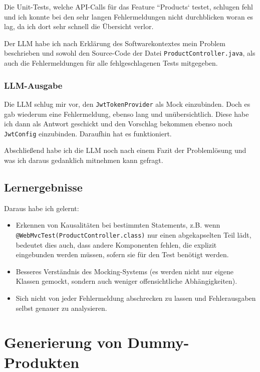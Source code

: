 \documentclass[12pt, a4paper]{scrreprt}
\begin{document}
	Die Unit-Tests, welche API-Calls für das Feature ``Products` testet, schlugen fehl und ich konnte bei den sehr langen Fehlermeldungen nicht durchblicken woran es lag, da ich dort sehr schnell die Übersicht verlor.

	Der LLM habe ich nach Erklärung des Softwarekontextes mein Problem beschrieben und sowohl den Source-Code der Datei \texttt{ProductController.java}, als auch die Fehlermeldungen für alle fehlgeschlagenen Tests mitgegeben.

	\subsubsection{LLM-Ausgabe}

	Die LLM schlug mir vor, den \texttt{JwtTokenProvider} als Mock einzubinden. Doch es gab wiederum eine Fehlermeldung, ebenso lang und unübersichtlich. Diese habe ich dann als Antwort geschickt und den Vorschlag bekommen ebenso noch \texttt{JwtConfig} einzubinden. Daraufhin hat es funktioniert.

	Abschließend habe ich die LLM noch nach einem Fazit der Problemlösung und was ich daraus gedanklich mitnehmen kann gefragt.

	\subsection{Lernergebnisse}

	Daraus habe ich gelernt:

	\begin{itemize}
		\item Erkennen von Kausalitäten bei bestimmten Statements, \linebreak z.B. wenn
		\texttt{@WebMvcTest(ProductController.}\texttt{class)} nur einen abgekapselten Teil
		lädt, bedeutet dies auch, dass andere Komponenten fehlen, die explizit
		eingebunden werden müssen, sofern sie für den Test benötigt werden.

		\item Besseres Verständnis des Mocking-Systems (es werden nicht nur
		eigene Klassen gemockt, sondern auch weniger offensichtliche Abhängigkeiten).

		\item Sich nicht von jeder Fehlermeldung abschrecken zu lassen und
		Fehlerausgaben selbst genauer zu analysieren.
	\end{itemize}

	\section{Generierung von Dummy-Produkten}
\end{document}
